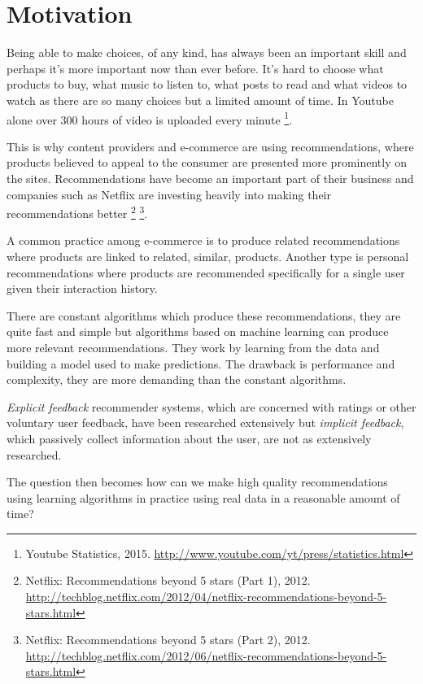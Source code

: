 
\section{Motivation}\label{sec:intro:motivation}

Being able to make choices, of any kind, has always been an important skill and perhaps it's more important now than ever before. It's hard to choose what products to buy, what music to listen to, what posts to read and what videos to watch as there are so many choices but a limited amount of time. In Youtube alone over 300 hours of video is uploaded every minute \footnote{Youtube Statistics, 2015. \url{http://www.youtube.com/yt/press/statistics.html}}.

This is why content providers and e-commerce are using recommendations, where products believed to appeal to the consumer are presented more prominently on the sites. Recommendations have become an important part of their business and companies such as Netflix are investing heavily into making their recommendations better \footnote{ Netflix: Recommendations beyond 5 stars (Part 1), 2012. \url{http://techblog.netflix.com/2012/04/netflix-recommendations-beyond-5-stars.html} } \footnote{ Netflix: Recommendations beyond 5 stars (Part 2), 2012. \url{http://techblog.netflix.com/2012/06/netflix-recommendations-beyond-5-stars.html} }.

A common practice among e-commerce is to produce related recommendations where products are linked to related, similar, products. Another type is personal recommendations where products are recommended specifically for a single user given their interaction history.

There are constant algorithms which produce these recommendations, they are quite fast and simple but algorithms based on machine learning can produce more relevant recommendations. They work by learning from the data and building a model used to make predictions. The drawback is performance and complexity, they are more demanding than the constant algorithms.

\textit{Explicit feedback} recommender systems, which are concerned with ratings or other voluntary user feedback, have been researched extensively but \textit{implicit feedback}, which passively collect information about the user, are not as extensively researched. \citep{hu2008collaborative}


The question then becomes how can we make high quality recommendations using learning algorithms in practice using real data in a reasonable amount of time?


